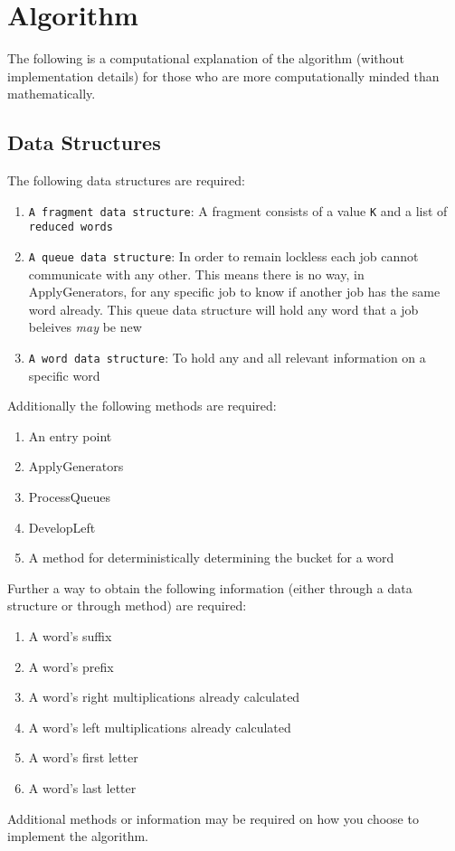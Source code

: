\documentclass{report}
\begin{document}
\section*{Algorithm}
The following is a computational explanation of the algorithm (without implementation details) for those who are more computationally minded than mathematically.
\newline
\subsection*{Data Structures}
The following data structures are required:
\begin{enumerate}
\item \texttt{A fragment data structure}: A fragment consists of a value \texttt{K} and a list of \texttt{reduced words}
\item \texttt{A queue data structure}: In order to remain lockless each job cannot communicate with any other. This means there is no way, in ApplyGenerators,
for any specific job to know if another job has the same word already. This queue data structure will hold any word that a job beleives \textit{may} be new
\item \texttt{A word data structure}: To hold any and all relevant information on a specific word
\end{enumerate}

Additionally the following methods are required:

\begin{enumerate}
\item An entry point
\item ApplyGenerators
\item ProcessQueues
\item DevelopLeft
\item A method for deterministically determining the bucket for a word
\end{enumerate}

Further a way to obtain the following information (either through a data structure or through method) are required:

\begin{enumerate}
\item A word's suffix
\item A word's prefix
\item A word's right multiplications already calculated
\item A word's left multiplications already calculated
\item A word's first letter
\item A word's last letter
\end{enumerate}

Additional methods or information may be required on how you choose to implement the algorithm.



\end{document}
